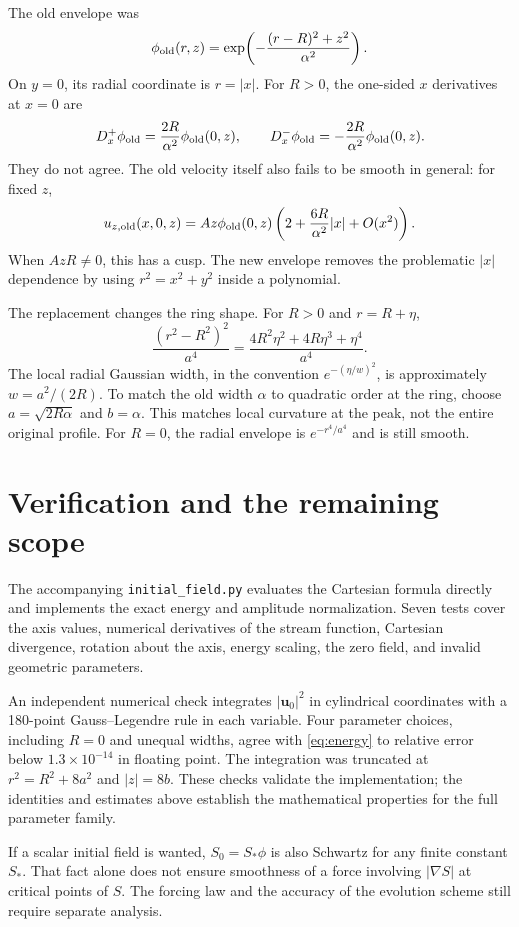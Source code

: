 \documentclass[11pt]{article}
\newcommand{\uu}{\mathbf u_0}
\begin{document}
The old envelope was
\[
\phi_{\rm old}(r,z)=
\exp\!\left(-\frac{(r-R)^2+z^2}{\alpha^2}\right).
\]
On $y=0$, its radial coordinate is $r=|x|$. For $R>0$, the one-sided
$x$ derivatives at $x=0$ are
\[
D_x^+\phi_{\rm old}=\frac{2R}{\alpha^2}\phi_{\rm old}(0,z),
\qquad
D_x^-\phi_{\rm old}=-\frac{2R}{\alpha^2}\phi_{\rm old}(0,z).
\]
They do not agree. The old velocity itself also fails to be smooth in
general: for fixed $z$,
\[
u_{z,\rm old}(x,0,z)=
Az\phi_{\rm old}(0,z)
\left(2+\frac{6R}{\alpha^2}|x|+O(x^2)\right).
\]
When $AzR\ne0$, this has a cusp. The new envelope removes the problematic
$|x|$ dependence by using $r^2=x^2+y^2$ inside a polynomial.

The replacement changes the ring shape. For $R>0$ and $r=R+\eta$,
\[
\frac{(r^2-R^2)^2}{a^4}
=\frac{4R^2\eta^2+4R\eta^3+\eta^4}{a^4}.
\]
The local radial Gaussian width, in the convention
$e^{-(\eta/w)^2}$, is approximately $w=a^2/(2R)$.
To match the old width $\alpha$ to quadratic order at the ring, choose
$a=\sqrt{2R\alpha}$ and $b=\alpha$.
This matches local curvature at the peak, not the entire original profile.
For $R=0$, the radial envelope is $e^{-r^4/a^4}$ and is still smooth.

\section{Verification and the remaining scope}

The accompanying \texttt{initial\_field.py} evaluates the Cartesian formula
directly and implements the exact energy and amplitude normalization.
Seven tests cover the axis values, numerical derivatives of the stream
function, Cartesian divergence, rotation about the axis, energy scaling,
the zero field, and invalid geometric parameters.

An independent numerical check integrates $|\uu|^2$ in cylindrical
coordinates with a 180-point Gauss--Legendre rule in each variable.
Four parameter choices, including $R=0$ and unequal widths, agree with
\eqref{eq:energy} to relative error below $1.3\times10^{-14}$ in floating
point. The integration was truncated at
$r^2=R^2+8a^2$ and $|z|=8b$.
These checks validate the implementation; the identities and estimates
above establish the mathematical properties for the full parameter family.

If a scalar initial field is wanted, $S_0=S_*\phi$ is also Schwartz for any
finite constant $S_*$. That fact alone does not ensure smoothness of a
force involving $|\nabla S|$ at critical points of $S$.
The forcing law and the accuracy of the evolution scheme still require
separate analysis.
\end{document}
